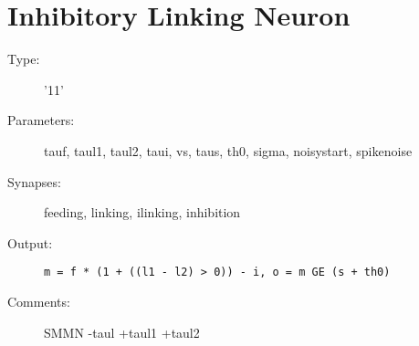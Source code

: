 \documentclass[12pt]{article}
\begin{document}
\section{Inhibitory Linking Neuron}
\begin{description}
\item[Type:] '11'

\item[Parameters:] tauf, taul1, taul2, taui, vs, taus, th0, sigma, noisystart, 
              spikenoise

\item[Synapses:] feeding, linking, ilinking, inhibition

\item[Output:] \texttt{m = f * (1 + ((l1 - l2) > 0)) - i, o = m GE (s + th0)}

\item[Comments:] SMMN -taul +taul1 +taul2 
\end{description}
\end{document}
